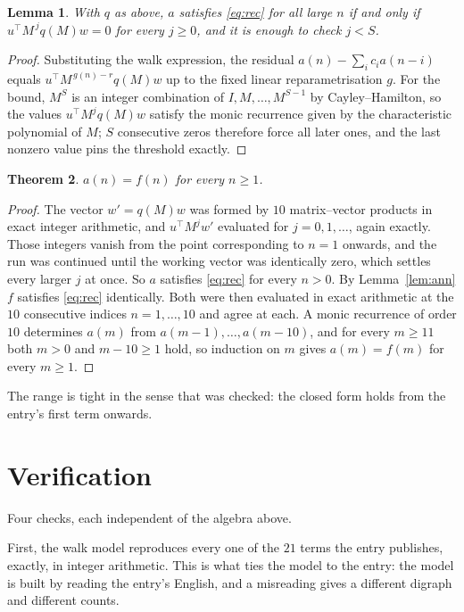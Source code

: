 \documentclass[11pt,a4paper]{article}
\theoremstyle{plain}
\newtheorem{theorem}{Theorem}
\newtheorem{lemma}[theorem]{Lemma}
\theoremstyle{definition}
\begin{document}
\begin{lemma}\label{lem:crit}
With $q$ as above, $a$ satisfies \eqref{eq:rec} for all large $n$ if and only if
$u^{\!\top}M^{\,j}q(M)w=0$ for every $j\ge0$, and it is enough to check $j<S$.
\end{lemma}

\begin{proof}
Substituting the walk expression, the residual $a(n)-\sum_ic_ia(n-i)$ equals
$u^{\!\top}M^{\,g(n)-r}q(M)w$ up to the fixed linear reparametrisation $g$. For the bound,
$M^{S}$ is an integer combination of $I,M,\dots,M^{S-1}$ by Cayley--Hamilton, so the values
$u^{\!\top}M^{j}q(M)w$ satisfy the monic recurrence given by the characteristic polynomial of
$M$; $S$ consecutive zeros therefore force all later ones, and the last nonzero value pins the
threshold exactly.
\end{proof}

\begin{theorem}
$a(n)=f(n)$ for every $n\ge1$.
\end{theorem}

\begin{proof}
The vector $w'=q(M)w$ was formed by $10$ matrix--vector products in exact integer
arithmetic, and $u^{\!\top}M^{j}w'$ evaluated for $j=0,1,\dots$, again exactly. Those integers
vanish from the point corresponding to $n=1$ onwards, and the run was continued until the
working vector was identically zero, which settles every larger $j$ at once. So $a$ satisfies
\eqref{eq:rec} for every $n>0$. By Lemma~\ref{lem:ann} $f$ satisfies \eqref{eq:rec}
identically. Both were then evaluated in exact arithmetic at the $10$ consecutive indices
$n=1,\dots,10$ and agree at each. A monic recurrence of order $10$
determines $a(m)$ from $a(m-1),\dots,a(m-10)$, and for every $m\ge11$ both
$m>0$ and $m-10\ge1$ hold, so induction on $m$ gives $a(m)=f(m)$ for every
$m\ge1$.
\end{proof}

The range is tight in the sense that was checked: the closed form holds from the entry's first term onwards.

\section{Verification}

Four checks, each independent of the algebra above.

First, the walk model reproduces every one of the $21$ terms the entry publishes,
exactly, in integer arithmetic. This is what ties the model to the entry: the model is built
by reading the entry's English, and a misreading gives a different digraph and different
counts.
\end{document}
